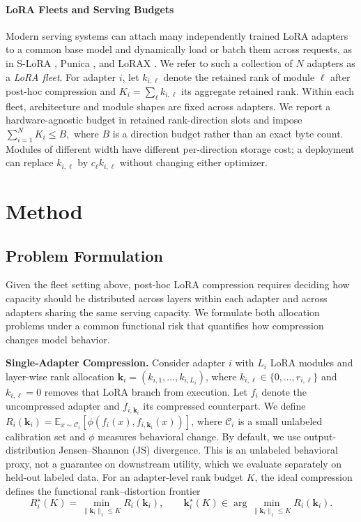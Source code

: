 \documentclass{article}
\begin{document}
\paragraph{LoRA Fleets and Serving Budgets}
Modern serving systems can attach many independently trained LoRA adapters to
a common base model and dynamically load or batch them across requests, as in
S-LoRA \citep{sheng2024slora}, Punica \citep{chen2024punica}, and
LoRAX \citep{predibase2023lorax}. We refer to such a collection of $N$
adapters as a \emph{LoRA fleet}. For adapter $i$, let $k_{i,\ell}$ denote the
retained rank of module $\ell$ after post-hoc compression and
$
  K_i=\sum_{\ell}k_{i,\ell}
  \label{eq:adapter-rank-budget}
$
its aggregate retained rank. Within each fleet, architecture and module shapes
are fixed across adapters. We report a hardware-agnostic budget in retained
rank-direction slots and impose
$
  \sum_{i=1}^{N}K_i\le B,
  \label{eq:fleet-rank-budget}
$
where $B$ is a direction budget rather than an exact byte count. Modules of
different width have different per-direction storage cost; a deployment can
replace $k_{i,\ell}$ by $c_\ell k_{i,\ell}$ without changing either optimizer.

\section{Method}
\label{sec:method}

\subsection{Problem Formulation}

Given the fleet setting above, post-hoc LoRA compression requires deciding how
capacity should be distributed across layers within each adapter and across
adapters sharing the same serving capacity. We formulate both allocation
problems under a common functional risk that quantifies how compression changes
model behavior.

\textbf{Single-Adapter Compression.}
Consider adapter $i$ with $L_i$ LoRA modules and layer-wise rank allocation
$\mathbf{k}_i=(k_{i,1},\ldots,k_{i,L_i})$, where
$k_{i,\ell}\in\{0,\ldots,r_{i,\ell}\}$ and $k_{i,\ell}=0$ removes that LoRA
branch from execution. Let $f_i$ denote the uncompressed
adapter and $f_{i,\mathbf{k}_i}$ its compressed counterpart. We define
$R_i(\mathbf{k}_i)=
\mathbb{E}_{x\sim\mathcal{C}_i}
[\phi(f_i(x),f_{i,\mathbf{k}_i}(x))]$,
where $\mathcal{C}_i$ is a small unlabeled calibration set and $\phi$ measures
behavioral change. By default, we use output-distribution Jensen--Shannon (JS) divergence.
This is an unlabeled behavioral proxy, not a guarantee on downstream utility,
which we evaluate separately on held-out labeled data.
For an adapter-level rank budget $K$, the ideal compression defines the
functional rank--distortion frontier
\begin{equation}
	R_i^\star(K)
	=
	\min_{\|\mathbf{k}_i\|_1\le K} R_i(\mathbf{k}_i),
	\qquad
	\mathbf{k}_i^\star(K)
	\in
	\arg\min_{\|\mathbf{k}_i\|_1\le K} R_i(\mathbf{k}_i).
	\label{eq:single-frontier}
\end{equation}
\end{document}

